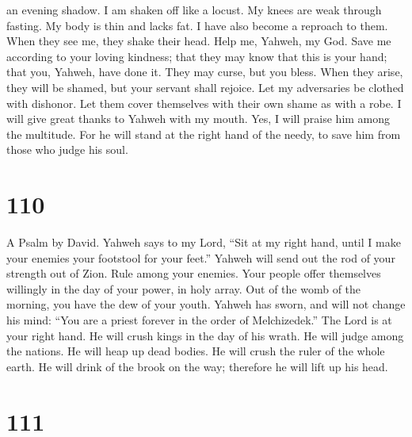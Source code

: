 an evening shadow. I am shaken off like a locust.  My
knees are weak through fasting. My body is thin and lacks fat.
 I have also become a reproach to them. When they see me,
they shake their head.  Help me, Yahweh, my God. Save me
according to your loving kindness;  that they may know
that this is your hand; that you, Yahweh, have done it. 
They may curse, but you bless. When they arise, they will be shamed, but
your servant shall rejoice.  Let my adversaries be
clothed with dishonor. Let them cover themselves with their own shame as
with a robe.  I will give great thanks to Yahweh with my
mouth. Yes, I will praise him among the multitude.  For
he will stand at the right hand of the needy, to save him from those who
judge his soul.

\hypertarget{section-102}{%
\section{110}\label{section-102}}

A Psalm by David.  Yahweh says to my Lord, ``Sit at my
right hand, until I make your enemies your footstool for your feet.''
 Yahweh will send out the rod of your strength out of
Zion. Rule among your enemies.  Your people offer
themselves willingly in the day of your power, in holy array. Out of the
womb of the morning, you have the dew of your youth. 
Yahweh has sworn, and will not change his mind: ``You are a priest
forever in the order of Melchizedek.''  The Lord is at
your right hand. He will crush kings in the day of his wrath.
 He will judge among the nations. He will heap up dead
bodies. He will crush the ruler of the whole earth.  He
will drink of the brook on the way; therefore he will lift up his head.

\hypertarget{section-103}{%
\section{111}\label{section-103}}

